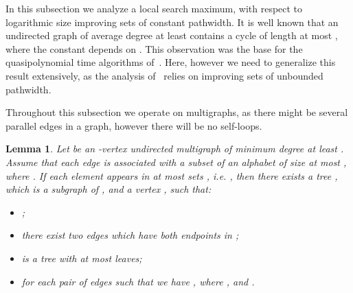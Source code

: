 \documentclass[11pt]{article}
\newtheorem{lemma}[theorem]{Lemma}
\theoremstyle{definition}
\begin{document}
In this subsection we analyze a local search maximum, with respect
to logarithmic size improving sets of constant pathwidth.
It is well known that an undirected graph of average degree
at least  contains a cycle of length at most ,
   where the constant  depends on .
This observation was the base for the quasipolynomial time algorithms of~\cite{h95,cgm13}.
Here, however we need to generalize this result extensively,
as the analysis of~\cite{cgm13} relies on improving sets of unbounded pathwidth.

Throughout this subsection we operate on multigraphs, as there might be several
parallel edges in a graph, however there will be no self-loops.

\begin{lemma}
\label{lem:improving-tree}
Let  be an -vertex undirected multigraph of minimum degree at least .
Assume that each edge  is associated with a subset of an alphabet  of size at most , where .
If each element  appears in at most  sets , i.e. , then
there exists a tree , which is a subgraph of , and a vertex , such that:
\begin{itemize}
  \item ;
  \item there exist two edges  which have both endpoints in ;
  \item  is a tree with at most  leaves; 
  \item for each pair of edges  such that 
  we have , where ,
  and .
\end{itemize}
\end{lemma}
\end{document}
